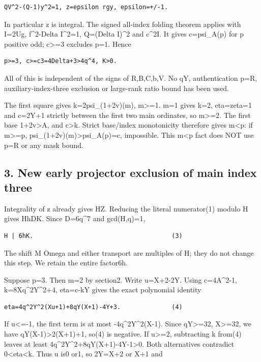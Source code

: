\begin{verbatim}
QV^2-(Q-1)y^2=1, z=epsilon rgy, epsilon=+/-1.
\end{verbatim}

In particular z is integral. The signed all-index folding theorem
applies with I=2Ug, f\^{}2-Delta I\^{}2=1, Q=(Delta I)\^{}2 and
c\^{}2\textbar I. It gives c=psi\_A(p) for p positive odd;
c\textgreater=3 excludes p=1. Hence

\begin{verbatim}
p>=3, c>=c3=4Delta+3>4q^4, K>0.
\end{verbatim}

All of this is independent of the signs of R,B,C,b,V. No q\textbar Y,
authentication p=R, auxiliary-index-three exclusion or large-rank ratio
bound has been used.

The first square gives k=2psi\_(1+2v)(m), m\textgreater=1. m=1 gives
k=2, eta=zeta=1 and c=2Y+1 strictly between the first two main
ordinates, so m\textgreater=2. The first base 1+2v\textgreater A, and
c\textgreater k. Strict base/index monotonicity therefore gives
m\textless p: if m\textgreater=p,
psi\_(1+2v)(m)\textgreater psi\_A(p)=c, impossible. This m\textless p
fact does NOT use p=R or any mask bound.

\subsection{3. New early projector exclusion of main index
three}\label{new-early-projector-exclusion-of-main-index-three}

Integrality of z already gives H\textbar Z. Reducing the literal
numerator(1) modulo H gives H\textbar hDK. Since D=6q\^{}7 and
gcd(H,q)=1,

\begin{verbatim}
H | 6hK.                                      (3)
\end{verbatim}

The shift M Omega and either transport are multiples of H; they do not
change this step. We retain the entire factor6h.

Suppose p=3. Then m=2 by section2. Write u=X+2-2Y. Using c=4A\^{}2-1,
k=8Xq\^{}2Y\^{}2+4, eta=c-kY gives the exact polynomial identity

\begin{verbatim}
eta=4q^2Y^2(Xu+1)+8qY(X+1)-4Y+3.              (4)
\end{verbatim}

If u\textless=-1, the first term is at most -4q\^{}2Y\^{}2(X-1). Since
qY\textgreater=32, X\textgreater=32, we have
qY(X-1)\textgreater2(X+1)+1, so(4) is negative. If u\textgreater=2,
subtracting k from(4) leaves at least
4q\^{}2Y\^{}2+8qY(X+1)-4Y-1\textgreater0. Both alternatives contradict
0\textless eta\textless k. Thus u is0 or1, so 2Y=X+2 or X+1 and

